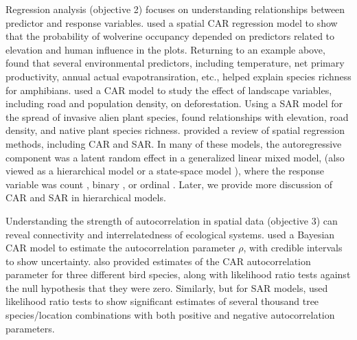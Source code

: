 \documentclass[11pt, titlepage]{article}\usepackage[]{graphicx}\usepackage[]{color}
\begin{document}
\begin{spacing}{1.9}
\begin{flushleft}
Regression analysis (objective 2) focuses on understanding relationships between predictor and response variables.  \citet{Gard:Lawl:Ver:Mago:Kell:coar:2010} used a spatial CAR regression model to show that the probability of wolverine occupancy depended on predictors related to elevation and human influence in the plots. Returning to an example above, \citet{Cass:Dini:Rang:Thia:spat:2007} found that several environmental predictors, including temperature, net primary productivity, annual actual evapotransiration, etc., helped explain species richness for amphibians.  \citet{Agar:Sila:Gelf:Dewa:Mick:trop:2005} used a CAR model to study the effect of landscape variables, including road and population density, on deforestation.  Using a SAR model for the spread of invasive alien plant species, \citet{Dark:biog:2004} found relationships with elevation, road density, and native plant species richness. \citet{Beal:Lenn:Year:Brew:Elst:regr:2010} provided a review of spatial regression methods, including CAR and SAR.  In many of these models, the autoregressive component was a latent random effect in a generalized linear mixed model, (also viewed as a hierarchical model \citep{Cres:Cald:Clar:VerH:acco:2009} or a state-space model \citep{deVa:Hast:fitt:2002}), where the response variable was count \citep{Clay:Kald:empi:1987}, binary \citep{Gard:Lawl:Ver:Mago:Kell:coar:2010}, or ordinal \citep{Agar:Sila:Gelf:Dewa:Mick:trop:2005}.  Later, we provide more discussion of CAR and SAR in hierarchical models.

Understanding the strength of autocorrelation in spatial data (objective 3) can reveal connectivity and interrelatedness of ecological systems.  \citet{Gard:Lawl:Ver:Mago:Kell:coar:2010} used a Bayesian CAR model to estimate the autocorrelation parameter $\rho$, with credible intervals to show uncertainty. \citet{Lich:Simo:Shri:Fran:spat:2002} also provided estimates of the CAR autocorrelation parameter for three different bird species, along with likelihood ratio tests against the null hypothesis that they were zero.  Similarly, but for SAR models, \citet{Bull:Burk:eval:2005} used likelihood ratio tests to show significant estimates of several thousand tree species/location combinations with both positive and negative autocorrelation parameters.


\end{flushleft}
\end{spacing}
\end{document}
